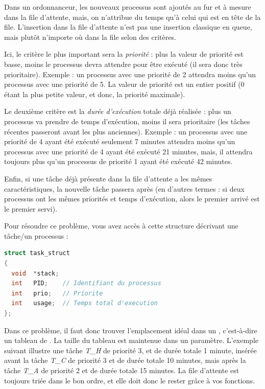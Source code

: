 \documentclass[11pt,a4paper]{article}
\begin{document}
\noindent Dans un ordonnanceur, les nouveaux processus sont ajoutés au fur et à mesure dans la file d'attente, mais, on n'attribue du temps qu'à celui qui est en tête de la file.
L'insertion dans la file d'attente n'est pas une insertion classique en queue, mais plutôt n'importe où dans la file selon des critères.

\medskip

\noindent Ici, le critère le plus important sera la \textit{priorité} : plus la valeur de priorité est basse, moins le processus devra attendre pour être exécuté (il sera donc très prioritaire).
Exemple : un processus avec une priorité de 2 attendra moins qu'un processus avec une priorité de 5.
La valeur de priorité est un entier positif (0 étant la plus petite valeur, et donc, la priorité maximale).

\medskip

\noindent Le deuxième critère est la \textit{durée d'exécution} totale déjà réalisée : plus un processus va prendre de temps d'exécution, moins il sera prioritaire (les tâches récentes passeront avant les plus anciennes).
Exemple : un processus avec une priorité de 4 ayant été exécuté seulement 7 minutes attendra moins qu'un processus avec une priorité de 4 ayant été exécuté 21 minutes, mais, il attendra toujours plus qu'un processus de priorité 1 ayant été exécuté 42 minutes.

\medskip

\noindent Enfin, si une tâche déjà présente dans la file d'attente a les mêmes caractéristiques, la nouvelle tâche passera après (en d'autres termes : si deux processus ont les mêmes priorités et temps d'exécution, alors le premier arrivé est le premier servi).

\bigskip

\noindent Pour résoudre ce problème, vous avez accès à cette structure  décrivant une tâche/un processus :
\begin{lstlisting}[language=C,commentstyle=\color{commentgreen}]
struct task_struct
{
  void  *stack;
  int   PID;    // Identifiant du processus
  int   prio;   // Priorite
  int   usage;  // Temps total d'execution
}; \end{lstlisting}



\noindent Dans ce problème, il faut donc trouver l'emplacement idéal dans un , c'est-à-dire un tableau de .
La taille du tableau est maintenue dans un paramètre.
L'exemple suivant illustre une tâche \textit{T\_H} de priorité 3, et de durée totale 1 minute, insérée avant la tâche \textit{T\_C} de priorité 3 et de durée totale 10 minutes, mais après la tâche \textit{T\_A} de priorité 2 et de durée totale 15 minutes.
La file d'attente est toujours triée dans le bon ordre, et elle doit donc le rester grâce à vos fonctions.
\end{document}

